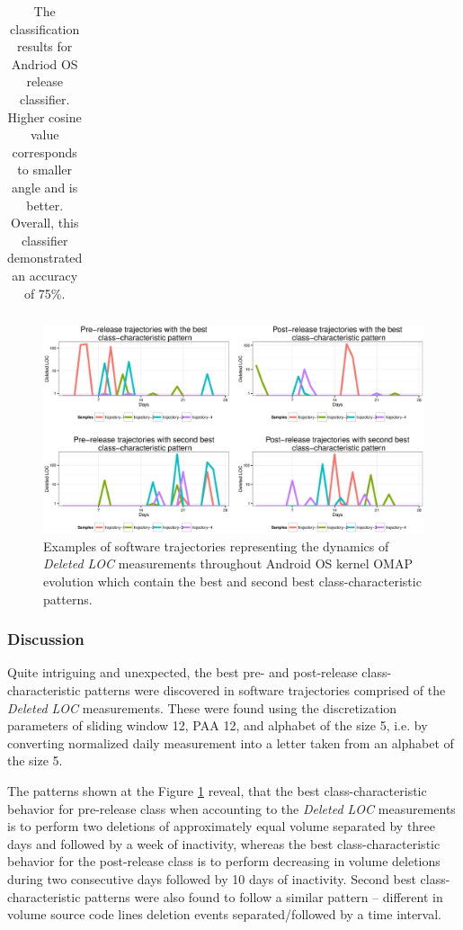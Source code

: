 {\begin{table}[t!]
{{\begin{minipage}[b]{0.47\hsize}
\begin{tabular}{l c c c}
\bottomrule
\end{tabular}
\end{minipage}%
\caption{The classification results for Andriod OS release classifier. Higher cosine value corresponds to smaller angle 
and is better. Overall, this classifier demonstrated an accuracy of 75\%.}
\label{android_table3}
}}
\end{table}
\begin{figure}[h!]
   \centering
   \includegraphics[width=150mm]{figures/omap_deleted_lines_patterns_plot.eps}
   \caption{Examples of software trajectories representing the dynamics of \textit{Deleted LOC} measurements throughout Android OS kernel OMAP evolution which contain the best and second best class-characteristic patterns.}
   \label{fig:OMAP_patterns}
\end{figure}
} %

\subsubsection{Discussion}
Quite intriguing and unexpected, the best pre- and post-release class-characteristic patterns were discovered in software trajectories comprised of the \textit{Deleted LOC} measurements. These were found using the discretization parameters of sliding window 12, PAA 12, and alphabet of the size 5, i.e. by converting normalized daily measurement into a letter taken from an alphabet of the size 5. 

The patterns shown at the Figure \ref{fig:OMAP_patterns} reveal, that the best class-characteristic behavior for pre-release class when accounting to the \textit{Deleted LOC} measurements is to perform two deletions of approximately equal volume separated by three days and followed by a week of inactivity, whereas the best class-characteristic behavior for the post-release class is to perform decreasing in volume deletions during two consecutive days followed by 10 days of inactivity. Second best class-characteristic patterns were also found to follow a similar pattern -- different in volume source code lines deletion events separated/followed by a time interval.

